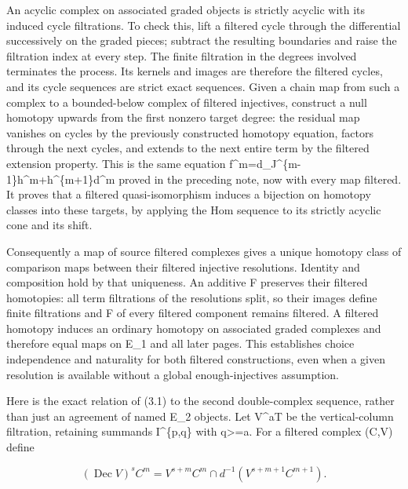 An acyclic complex on associated graded objects is strictly acyclic with its induced cycle filtrations. To check this,\allowbreak{} lift a filtered cycle through the differential successively on the graded pieces; subtract the resulting boundaries and raise the filtration index at every step. The finite filtration in the degrees involved terminates the process. Its kernels and images are therefore the filtered cycles,\allowbreak{} and its cycle sequences are strict exact sequences. Given a chain map from such a complex to a bounded-below complex of filtered injectives,\allowbreak{} construct a null homotopy upwards from the first nonzero target degree:\allowbreak{} the residual map vanishes on cycles by the previously constructed homotopy equation,\allowbreak{} factors through the next cycles,\allowbreak{} and extends to the next entire term by the filtered extension property. This is the same equation f\textasciicircum{}m\allowbreak{}=d\_\allowbreak{}J\textasciicircum{}\{m-1\}h\textasciicircum{}m\allowbreak{}+h\textasciicircum{}\{m\allowbreak{}+1\}d\textasciicircum{}m proved in the preceding note,\allowbreak{} now with every map filtered. It proves that a filtered quasi-isomorphism induces a bijection on homotopy classes into these targets,\allowbreak{} by applying the Hom sequence to its strictly acyclic cone and its shift.

Consequently a map of source filtered complexes gives a unique homotopy class of comparison maps between their filtered injective resolutions. Identity and composition hold by that uniqueness. An additive F preserves their filtered homotopies:\allowbreak{} all term filtrations of the resolutions split,\allowbreak{} so their images define finite filtrations and F of every filtered component remains filtered. A filtered homotopy induces an ordinary homotopy on associated graded complexes and therefore equal maps on E\_\allowbreak{}1 and all later pages. This establishes choice independence and naturality for both filtered constructions,\allowbreak{} even when a given resolution is available without a global enough-injectives assumption.

Here is the exact relation of (3.1)\allowbreak{} to the second double-complex sequence,\allowbreak{} rather than just an agreement of named E\_\allowbreak{}2 objects. Let V\^{}aT be the vertical-column filtration,\allowbreak{} retaining summands I\textasciicircum{}\{p,\allowbreak{}q\} with q>\allowbreak{}=a. For a filtered complex (C,\allowbreak{}V)\allowbreak{} define

\[
 (\operatorname{Dec}V)^s C^m
   =V^{s+m}C^m\cap d^{-1}(V^{s+m+1}C^{m+1}).                  \tag{3.2}
\]

